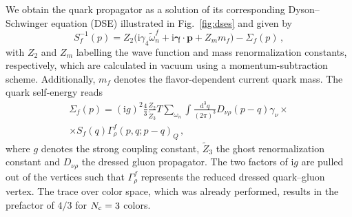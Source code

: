 \documentclass[%
    aps,
    prd,
    reprint,
    superscriptaddress,
    floatfix,
    nofootinbib,
    noamsmath,
    noamssymb
]{revtex4-2}
\renewcommand*{\vec}[1]{\bm{#1}}
\newcommand*{\+}{\hspace*{.08335em}}
\newcommand*{\?}{\hspace*{-.08335em}}
\newcommand*{\dd}{\mathrm{d}}
\newcommand*{\ii}{\mathrm{i}}
\newcommand*{\Nc}{N_{\textup{c}}}
\newcommand*{\gs}{g}
\begin{document}
We obtain the quark propagator as a solution of its corresponding
Dyson--Schwinger equation (DSE) illustrated in Fig.~\ref{fig:dses} and given by
\begin{equation}
    \label{eq:quark_dse}
    S_{f}^{-1}(p)
    =
    Z_{2}
    \bigl(
        \ii \gamma_{4} \tilde{\omega}_{n}^{f}
        +
        \ii \vec{\gamma} \cdot \vec{p}
        +
        Z_{m} m_{f}
    \bigr)
    -
    \Sigma_{f}(p)
    \,,
\end{equation}
with $Z_{2}$ and $Z_{m}$ labelling the wave function and mass renormalization
constants, respectively, which are calculated in vacuum using a
momentum-subtraction scheme. Additionally, $m_{f}$ denotes the flavor-dependent
current quark mass. The quark self-energy reads
\begin{multline}
    \label{eq:quark_self-energy}
    \Sigma_{f}(p)
    =
    (\ii \gs)^{2}
    \frac{4}{3}
    \frac{Z_{2}}{\tilde{Z}_{3}}
    T
    \sum_{\omega_{n}}
    \int \frac{\dd^{3} q}{(2 \pi)^{3}}
    D_{\nu\rho}(p - q)
    \gamma_{\nu}
    \times
    \\
    \times
    S_{f}(q)
    \Gamma_{\rho}^{f}(p, q; p-q)_{Q}
    \,,
\end{multline}
where $g$ denotes the strong coupling constant, $\tilde{Z}_{3}$ the ghost
renormalization constant and $D_{\nu\rho}$ the dressed gluon propagator. The two
factors of $\ii g$ are pulled out of the vertices such that $\Gamma_{\rho}^{f}$
represents the reduced dressed quark--gluon vertex. The trace over color space,
which was already performed, results in the prefactor of $4/3$ for $\Nc = 3$
colors.
\end{document}
